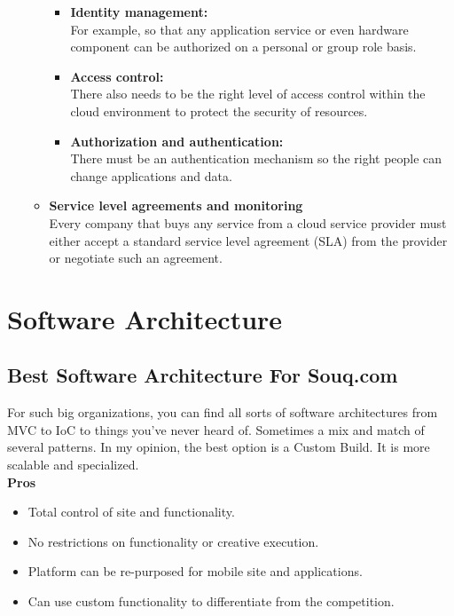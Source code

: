 \documentclass{book}
\begin{document}
\begin{enumerate}
\begin{itemize}
\begin{itemize}
\item \textbf{Identity management:\\}
For example, so that any application service or even hardware component can be authorized on a personal or group role basis.

\item \textbf{Access control:\\}
There also needs to be the right level of access control within the cloud environment to protect the security of resources.

\item \textbf{Authorization and authentication:\\}
There must be an authentication mechanism so the right people can change applications and data.\\

\end{itemize}

\item \textbf{Service level agreements and monitoring\\}
Every company that buys any service from a cloud service provider must either accept a standard service level agreement (SLA) from the provider or negotiate such an agreement.
\end{itemize}

\end{enumerate}

\chapter{Software Architecture}
\section{Best Software Architecture For Souq.com}
For such big organizations, you can find all sorts of software architectures from MVC to IoC to things you've never heard of. Sometimes a mix and match of several patterns. In my opinion, the best option  is a Custom Build. It is more scalable and specialized.\\

\textbf{Pros}
\begin{itemize}
\item Total control of site and functionality.
\item No restrictions on functionality or creative execution.
\item Platform can be re-purposed for mobile site and applications.
\item Can use custom functionality to differentiate from the competition.
\end{itemize}
\end{document}
